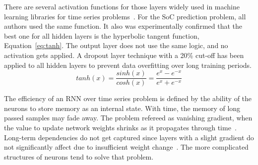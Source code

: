 %
%
There are several activation functions for those layers widely used in machine learning libraries for time series problems~\cite{amidi_cs_2018}.
For the SoC prediction problem, all authors used the same function.
It also was experimentally confirmed that the best one for all hidden layers is the hyperbolic tangent function, Equation~\ref{eq:tanh}.
The output layer does not use the same logic, and no activation gets applied.
A dropout layer technique with a 20\% cut-off has been applied to all hidden layers to prevent data overfitting over long training periods.
\begin{equation}
    tanh(x) = \frac{sinh(x)}{cosh(x)}=\frac{e^x-e^{-x}}{e^x+e^{-x}}
    \label{eq:tanh}
\end{equation}
%
%


%
The efficiency of an RNN over time series problem is defined by the ability of the neurons to store memory as an internal state.
With time, the memory of long passed samples may fade away.
The problem refereed as vanishing gradient, when the value to update network weights shrinks as it propagates through time~\cite{rasifaghihi_predictive_2020}.
Long-term dependencies do not get captured since layers with a slight gradient do not significantly affect due to insufficient weight change~\cite{rasifaghihi_predictive_2020,hochreiter_vanishing_1998}.
The more complicated structures of neurons tend to solve that problem.

